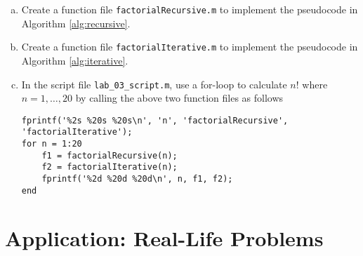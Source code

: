 \begin{enumerate}[(a)]
    \item Create a function file \verb|factorialRecursive.m| to implement the pseudocode in Algorithm \ref{alg:recursive}.
    \item Create a function file \verb|factorialIterative.m| to implement the pseudocode in Algorithm \ref{alg:iterative}.
    \item In the script file \verb|lab_03_script.m|, use a for-loop to calculate $n!$ where $n = 1, \ldots, 20$ by calling the above two function files as follows
        \begin{lstlisting}[style=MATLAB]
fprintf('%2s %20s %20s\n', 'n', 'factorialRecursive', 'factorialIterative');
for n = 1:20
    f1 = factorialRecursive(n);
    f2 = factorialIterative(n);
    fprintf('%2d %20d %20d\n', n, f1, f2);
end
        \end{lstlisting}
\end{enumerate}

\section{Application: Real-Life Problems}

